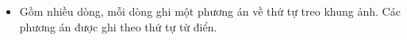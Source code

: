 \begin{itemize}
	\item Gồm nhiều dòng, mỗi dòng ghi một phương án về thứ tự treo khung ảnh. Các phương án được ghi theo thứ tự từ điển.
\end{itemize}

 